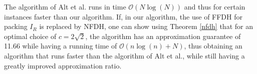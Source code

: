 \documentclass[a4paper,UKenglish,cleveref, autoref, thm-restate]{lipics_v2021}
\DeclareMathOperator{\argmin}{argmin}
\DeclareMathOperator{\argmax}{argmax}
\DeclareMathOperator{\width}{\mathtt{width}}
\DeclareMathOperator{\base}{\mathtt{base}}
\DeclareMathOperator{\vertices}{vertices}
\DeclareMathOperator{\R}{\mathbb{R}}
\begin{document}
The algorithm of Alt et al. runs in time $\mathcal{O}(N \log(N))$ and thus for certain instances faster than our algorithm. If, in our algorithm, the use of FFDH for packing $I_R$ is replaced by NFDH, one can show using Theorem \ref{nfdh} that for an optimal choice of $c=2 \sqrt{2}$, the algorithm has an approximation guarantee of 11.66 while having a running time of $\mathcal{O}(n \log(n) + N)$, thus obtaining an algorithm that runs faster than the algorithm of Alt et al., while still having a greatly improved approximation ratio.


\end{document}
